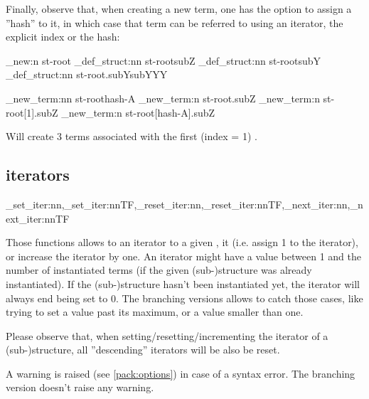 \documentclass[10pt]{article}
\begin{document}

Finally, observe that, when creating a new term, one has the option to assign a ''hash'' to it, in which case that term can be referred to using an iterator, the explicit index or the hash:

\begin{codestore}[store-env=demo6]
\starray_new:n {st-root}
\starray_def_struct:nn {st-root}{subZ}
\starray_def_struct:nn {st-root}{subY}
\starray_def_struct:nn {st-root.subY}{subYYY}

\starray_new_term:nn {st-root}{hash-A}
\starray_new_term:n {st-root.subZ}
\starray_new_term:n {st-root[1].subZ}
\starray_new_term:n {st-root[hash-A].subZ}
\end{codestore}
 
Will create 3  terms associated with the first (index = 1) .


\subsection{iterators}\label{pack:iter}

\begin{codedescribe}{\starray_set_iter:nn,\starray_set_iter:nnTF,\starray_reset_iter:nn,\starray_reset_iter:nnTF,\starray_next_iter:nn,\starray_next_iter:nnTF}
\begin{codesyntax}%
\end{codesyntax}
\end{codedescribe}
Those functions allows to  an iterator to a given ,  it (i.e. assign 1 to the iterator), or increase the iterator by one. An iterator might have a value between 1 and the number of instantiated terms (if the given (sub-)structure was already instantiated). If the (sub-)structure hasn't been instantiated yet, the iterator will always end being set to 0. The branching versions allows to catch those cases, like trying to set a value past its maximum, or a value smaller than one.

\begin{tsremark}[Important:]
Please observe that, when setting/resetting/incrementing the  iterator of a (sub-)structure, all ''descending'' iterators will be also be reset.
\end{tsremark}
\begin{tsremark}
A warning is raised (see \ref{pack:options}) in case of a  syntax error. The branching version doesn't raise any warning.
\end{tsremark}
\end{document}

